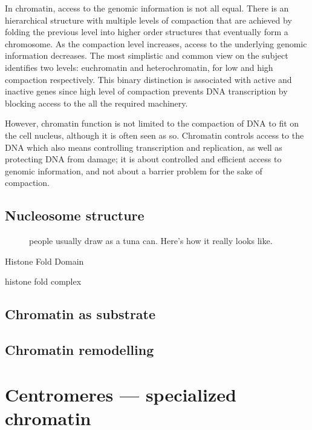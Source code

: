   In chromatin, access to the genomic information is not all equal.
  There is an hierarchical structure with
  multiple levels of compaction
  that are achieved by folding the previous level into higher order structures
  that eventually form a chromosome.
  As the compaction level increases, access to the underlying genomic
  information decreases.
  The most simplistic and common view on the subject
  identifies two levels: euchromatin and heterochromatin, for low and
  high compaction respectively.
  This binary distinction is associated with active and inactive genes
  since high level of compaction prevents DNA transcription by blocking
  access to the all the required machinery.

  However, chromatin function is not limited to the compaction of DNA
  to fit on the
  cell nucleus, although it is often seen as so.
  Chromatin controls access
  to the DNA which also means controlling transcription and replication, as
  well as protecting DNA from damage;  it is about controlled and efficient
  access to genomic information, and not about a barrier problem for the sake
  of compaction.

  \subsection{Nucleosome structure}

    \begin{figure}
      \centering
      \caption{people usually draw as a tuna can. Here's how it really
        looks like.}
      \label{fig:intro:nucleosome-structure}
    \end{figure}

    Histone Fold Domain

    histone fold complex

  \subsection{Chromatin as substrate}

  \subsection{Chromatin remodelling}

\section{Centromeres --- specialized chromatin}
